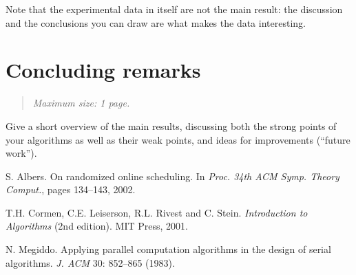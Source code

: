 \documentclass[11pt]{article}
\newcommand{\maxsize}[1]{\begin{quotation} {\sl \noindent Maximum size: #1.} \end{quotation}}
\begin{document}
Note that the experimental data in itself are not the main result: the discussion
and the conclusions you can draw are what makes the data interesting.





\section{Concluding remarks}
\label{se:conclusions}
\maxsize{1 page}
Give a short overview of the main results, discussing both the strong
points of your algorithms as well as their weak points, and ideas for improvements
(``future work'').



\begin{thebibliography}{}

S. Albers.
On randomized online scheduling.
In \emph{Proc. 34th ACM Symp. Theory Comput.}, pages 134--143, 2002.

T.H. Cormen, C.E. Leiserson, R.L. Rivest and C. Stein.
\emph{Introduction to Algorithms} (2nd edition).
MIT Press, 2001.

N. Megiddo.
Applying parallel computation algorithms in the design of serial algorithms.
\emph{J. ACM} 30: 852--865 (1983).

\end{thebibliography}
\end{document}
